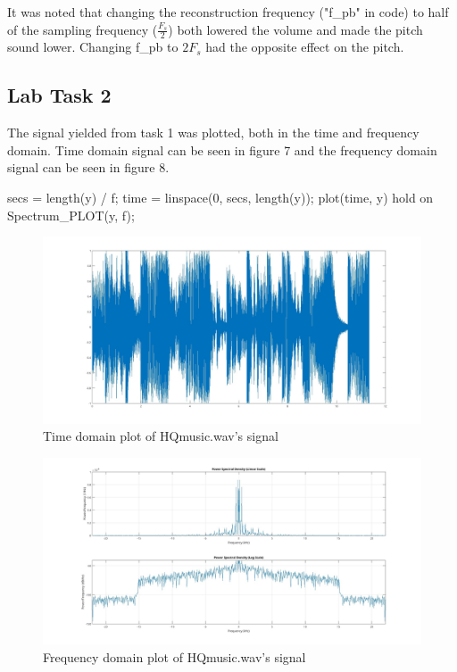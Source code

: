 \documentclass[a4paper,11pt]{article}
\begin{document}
It was noted that changing the reconstruction frequency ("f\_pb" in code) to half of the sampling frequency ($\frac{F_s}{2}$) both lowered the volume and made the pitch sound lower. Changing f\_pb to $2F_s$ had the opposite effect on the pitch.
\subsection{Lab Task 2}
The signal yielded from task 1 was plotted, both in the time and frequency domain. Time domain signal can be seen in figure 7 and the frequency domain signal can be seen in figure 8.

\begin{ffcode} 
secs = length(y) / f;
time = linspace(0, secs, length(y));
plot(time, y)
hold on
Spectrum_PLOT(y, f);
\end{ffcode}

\begin{figure}[H]
    \centering
    \hspace{-40pt}\includegraphics[scale = 0.2]{./images/Task2-PSD.jpg}
    \caption{Time domain plot of HQmusic.wav's signal}
    \label{fig:Task 2 Time domain}
\end{figure}

\begin{figure}[H]
    \centering
    \hspace{-60pt}\includegraphics[scale = 0.28]{./images/Task2-FFT.jpg}
    \caption{Frequency domain plot of HQmusic.wav's signal}
    \label{fig:Task 2 Freq. domain}
\end{figure}
\end{document}
